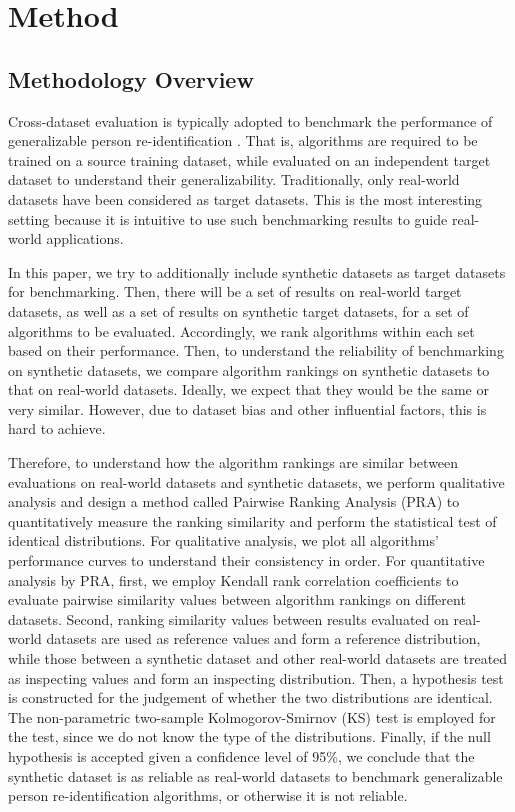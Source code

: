\documentclass[10pt,twocolumn,letterpaper]{article}
\begin{document}
\section{Method}


\subsection{Methodology Overview}





Cross-dataset evaluation is typically adopted to benchmark the performance of generalizable person re-identification \cite{yi2014deep, hu2014cross, liao2020interpretable}. That is, algorithms are required to be trained on a source training dataset, while evaluated on an independent target dataset to understand their generalizability. Traditionally, only real-world datasets have been considered as target datasets. This is the most interesting setting because it is intuitive to use such benchmarking results to guide real-world applications.

In this paper, we try to additionally include synthetic datasets as target datasets for benchmarking. Then, there will be a set of results on real-world target datasets, as well as a set of results on synthetic target datasets, for a set of algorithms to be evaluated. Accordingly, we rank algorithms within each set based on their performance. Then, to understand the reliability of benchmarking on synthetic datasets, we compare algorithm rankings on synthetic datasets to that on real-world datasets. Ideally, we expect that they would be the same or very similar. However, due to dataset bias and other influential factors, this is hard to achieve.

Therefore, to understand how the algorithm rankings are similar between evaluations on real-world datasets and synthetic datasets, we perform qualitative analysis and design a method called Pairwise Ranking Analysis (PRA) to quantitatively measure the ranking similarity and perform the statistical test of identical distributions. For qualitative analysis, we plot all algorithms' performance curves to understand their consistency in order. For quantitative analysis by PRA, first, we employ Kendall rank correlation coefficients to evaluate pairwise similarity values between algorithm rankings on different datasets. Second, ranking similarity values between results evaluated on real-world datasets are used as reference values and form a reference distribution, while those between a synthetic dataset and other real-world datasets are treated as inspecting values and form an inspecting distribution. Then, a hypothesis test is constructed for the judgement of whether the two distributions are identical. The non-parametric two-sample Kolmogorov-Smirnov (KS) test is employed for the test, since we do not know the type of the distributions. Finally, if the null hypothesis is accepted given a confidence level of 95\%, we conclude that the synthetic dataset is as reliable as real-world datasets to benchmark generalizable person re-identification algorithms, or otherwise it is not reliable.
\end{document}
